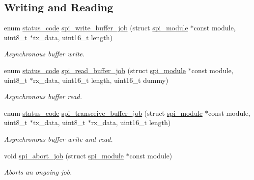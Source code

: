 \subsection*{Writing and Reading}
\begin{DoxyCompactItemize}
\item 
enum \mbox{\hyperlink{group__group__sam0__utils__status__codes_ga751c892e5a46b8e7d282085a5a5bf151}{status\+\_\+code}} \mbox{\hyperlink{group__asfdoc__sam0__sercom__spi__group_ga7a7ddeab7e3ed355e13366ed635ff152}{spi\+\_\+write\+\_\+buffer\+\_\+job}} (struct \mbox{\hyperlink{structspi__module}{spi\+\_\+module}} $\ast$const module, uint8\+\_\+t $\ast$tx\+\_\+data, uint16\+\_\+t length)
\begin{DoxyCompactList}\small\item\em Asynchronous buffer write. \end{DoxyCompactList}\item 
enum \mbox{\hyperlink{group__group__sam0__utils__status__codes_ga751c892e5a46b8e7d282085a5a5bf151}{status\+\_\+code}} \mbox{\hyperlink{group__asfdoc__sam0__sercom__spi__group_gac5022683cb35d827578c26cf7689ae61}{spi\+\_\+read\+\_\+buffer\+\_\+job}} (struct \mbox{\hyperlink{structspi__module}{spi\+\_\+module}} $\ast$const module, uint8\+\_\+t $\ast$rx\+\_\+data, uint16\+\_\+t length, uint16\+\_\+t dummy)
\begin{DoxyCompactList}\small\item\em Asynchronous buffer read. \end{DoxyCompactList}\item 
enum \mbox{\hyperlink{group__group__sam0__utils__status__codes_ga751c892e5a46b8e7d282085a5a5bf151}{status\+\_\+code}} \mbox{\hyperlink{group__asfdoc__sam0__sercom__spi__group_gaba6ac49efcf4b51fa8131d4a07071967}{spi\+\_\+transceive\+\_\+buffer\+\_\+job}} (struct \mbox{\hyperlink{structspi__module}{spi\+\_\+module}} $\ast$const module, uint8\+\_\+t $\ast$tx\+\_\+data, uint8\+\_\+t $\ast$rx\+\_\+data, uint16\+\_\+t length)
\begin{DoxyCompactList}\small\item\em Asynchronous buffer write and read. \end{DoxyCompactList}\item 
void \mbox{\hyperlink{group__asfdoc__sam0__sercom__spi__group_ga74d13a9fe3203f121664b864f68c94fd}{spi\+\_\+abort\+\_\+job}} (struct \mbox{\hyperlink{structspi__module}{spi\+\_\+module}} $\ast$const module)
\begin{DoxyCompactList}\small\item\em Aborts an ongoing job. \end{DoxyCompactList}\end{DoxyCompactItemize}


